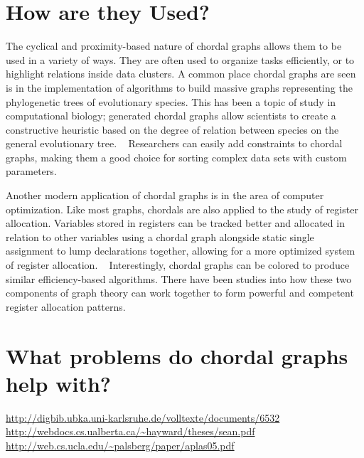 \section{How are they Used?}
The cyclical and proximity-based nature of chordal graphs allows them to be used in a variety of ways. They are often used to organize
tasks efficiently, or to highlight relations inside data clusters. A common place chordal graphs are seen is in the implementation of algorithms to build
massive graphs representing the phylogenetic trees of evolutionary species. This has been a topic of study in computational biology; generated chordal
graphs allow scientists to create a constructive heuristic based on the degree of relation between species on the general evolutionary tree. ~\cite{kennedy_2005}
Researchers can easily add constraints to chordal graphs, making them a good choice for sorting complex data sets with custom parameters.\par
Another modern application of chordal graphs is in the area of computer optimization. Like most graphs, chordals are also applied to the study of
register allocation. Variables stored in registers can be tracked better and allocated in relation to other variables using a chordal graph alongside
static single assignment to lump declarations together, allowing for a more optimized system of register allocation. ~\cite{hack_2007} Interestingly, chordal graphs
can be colored to produce similar efficiency-based algorithms. There have been studies into how these two components of graph theory can work together to
form powerful and competent register allocation patterns. \cite{pereira_palsberg}\\

\section{What problems do chordal graphs help with?}



\url{http://digbib.ubka.uni-karlsruhe.de/volltexte/documents/6532}\\
\url{http://webdocs.cs.ualberta.ca/~hayward/theses/sean.pdf}\\
\url{http://web.cs.ucla.edu/~palsberg/paper/aplas05.pdf}



